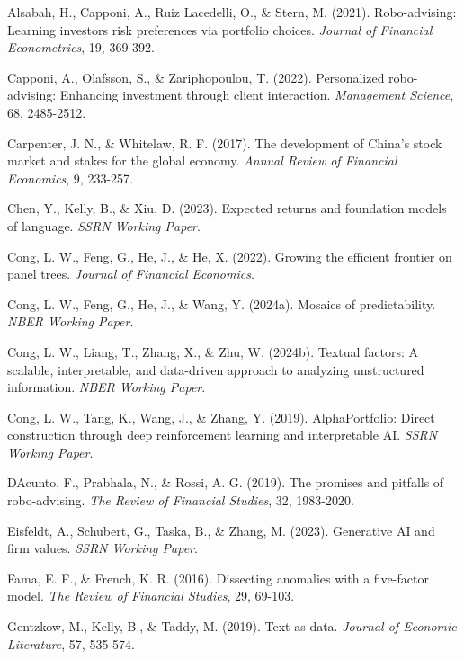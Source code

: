 \documentclass[a4paper,12pt]{article}
\begin{document}
\renewcommand{\refname}{Tài liệu tham khảo}
\begin{thebibliography}{99}

Alsabah, H., Capponi, A., Ruiz Lacedelli, O., \& Stern, M. (2021). Robo-advising: Learning investors risk preferences via portfolio choices. \textit{Journal of Financial Econometrics}, 19, 369-392.

Capponi, A., Olafsson, S., \& Zariphopoulou, T. (2022). Personalized robo-advising: Enhancing investment through client interaction. \textit{Management Science}, 68, 2485-2512.

Carpenter, J. N., \& Whitelaw, R. F. (2017). The development of China's stock market and stakes for the global economy. \textit{Annual Review of Financial Economics}, 9, 233-257.

Chen, Y., Kelly, B., \& Xiu, D. (2023). Expected returns and foundation models of language. \textit{SSRN Working Paper}.

Cong, L. W., Feng, G., He, J., \& He, X. (2022). Growing the efficient frontier on panel trees. \textit{Journal of Financial Economics}.

Cong, L. W., Feng, G., He, J., \& Wang, Y. (2024a). Mosaics of predictability. \textit{NBER Working Paper}.

Cong, L. W., Liang, T., Zhang, X., \& Zhu, W. (2024b). Textual factors: A scalable, interpretable, and data-driven approach to analyzing unstructured information. \textit{NBER Working Paper}.

Cong, L. W., Tang, K., Wang, J., \& Zhang, Y. (2019). AlphaPortfolio: Direct construction through deep reinforcement learning and interpretable AI. \textit{SSRN Working Paper}.

DAcunto, F., Prabhala, N., \& Rossi, A. G. (2019). The promises and pitfalls of robo-advising. \textit{The Review of Financial Studies}, 32, 1983-2020.

Eisfeldt, A., Schubert, G., Taska, B., \& Zhang, M. (2023). Generative AI and firm values. \textit{SSRN Working Paper}.

Fama, E. F., \& French, K. R. (2016). Dissecting anomalies with a five-factor model. \textit{The Review of Financial Studies}, 29, 69-103.

Gentzkow, M., Kelly, B., \& Taddy, M. (2019). Text as data. \textit{Journal of Economic Literature}, 57, 535-574.


\end{thebibliography}
\end{document}

